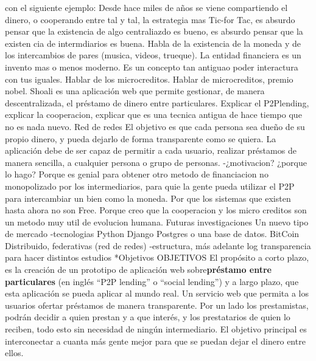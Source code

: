  con el siguiente ejemplo:
Desde hace miles de años se viene compartiendo el dinero, o cooperando entre tal y tal, la estrategia mas Tic-for Tac, es absurdo pensar que la existencia de algo centraliazdo es bueno, es absurdo pensar que la existen cia de intermdiarios es buena. Habla de la existencia de la moneda y de los intercambios de pares (musica, videos, trueque). La entidad financiera es un invento mas o menos moderno. Es un concepto tan antiguao poder interactura con tus iguales. Hablar de los microcreditos.
Hablar de microcreditos, premio nobel.
Shoali es una aplicación web que permite gestionar, de manera descentralizada, el préstamo de dinero entre particulares. Explicar el P2Plending, explicar la cooperacion, explicar que es una tecnica antigua de hace tiempo que no es nada nuevo. Red de redes
El objetivo es que cada persona sea dueño de su propio dinero, y pueda dejarlo de forma transparente como se quiera. La aplicación debe de ser capaz de permitir a cada usuario, realizar préstamos de manera sencilla, a cualquier persona o grupo de personas.
-¿motivacion? ¿porque lo hago?
Porque es genial para obtener otro metodo de financiacion no monopolizado por los intermediarios, para quie la gente pueda utilizar el P2P para intercambiar un bien como la moneda. Por que los sistemas que existen hasta ahora no son Free. Porque creo que la cooperacion y los micro creditos son un metodo muy util de evolucion humana.
Futuras investigaciones
Un nuevo tipo de mercado
-tecnologias
Python
Django
Postgres o una base de datos.
BitCoin
Distribuido, federativas (red de redes)
-estructura, más adelante
log transparencia para hacer distintos estudios
*Objetivos
OBJETIVOS
El propósito a corto plazo, es la creación de un prototipo de aplicación web sobre\textbf{préstamo entre particulares} (en inglés ``P2P lending'' o ``social lending'') y a largo plazo, que esta aplicación se pueda aplicar al mundo real. Un servicio web que permita a los usuarios ofertar préstamos de manera transparente. Por un lado los prestamistas, podrán decidir a quien prestan y a que interés, y los prestatarios de quien lo reciben, todo esto sin necesidad de ningún intermediario. El objetivo principal es interconectar a cuanta más gente mejor para que se puedan dejar el dinero entre ellos.

